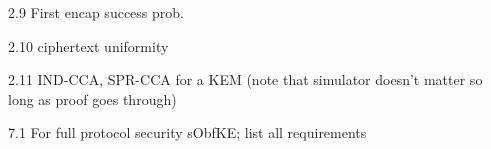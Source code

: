 \begin{definition}\label{def:first-encap-success}
    2.9 First encap success prob.
\end{definition}

\begin{definition}\label{def:ctxt-uniformity}
    2.10 ciphertext uniformity
\end{definition}

\begin{definition}\label{def:ind-spr-cca}
    2.11 IND-CCA, SPR-CCA for a KEM (note that simulator doesn't matter so long as proof goes through)
\end{definition}

\begin{theorem}\label{thm:s-obfuscated-keyex-security}
    7.1 For full protocol security sObfKE; list all requirements
\end{theorem}